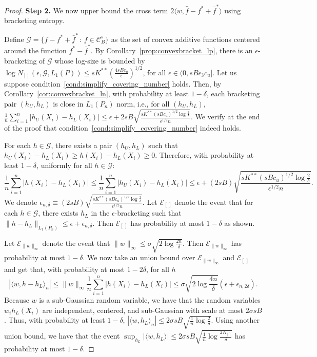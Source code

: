 \documentclass[12pt,pdftex,aos,noinfoline,addressasfootnote]{imsart}
\begin{document}
\begin{proof}


\textbf{Step 2.} We now upper bound the cross term $2 \langle w,
\hat{f} - f^* + \bar{f}^* \rangle$ using bracketing entropy.

Define $\mathcal{G} =\{ f - f^* + \bar{f}^* \,:\, f \in
\mathcal{C}^s_B \}$ 
as the set of convex additive functions centered around the function $f^* - \bar{f}^*$. 
By Corollary~\ref{prop:convexbracket_lp}, there is an $\epsilon$-bracketing of $\mathcal{G}$ whose log-size is bounded by $\log N_{[]}( \epsilon, \mathcal{G}, L_1(P)) \leq sK^{**} \left( \frac{4sBc_u}{\epsilon} \right)^{1/2}$, for all $\epsilon \in (0, sB \epsilon_3c_u]$.
Let us suppose condition~\ref{cond:simplify_covering_number} holds. Then, by Corollary~\ref{cor:convexbracket_ln}, with probability at least $1-\delta$, each bracketing pair $(h_U, h_L)$ is close in $L_1(P_n)$ norm, i.e., for all $(h_U, h_L)$, 
$\frac{1}{n} \sum_{i=1}^n | h_U(X_i) - h_L(X_i) | \leq \epsilon + 2sB \sqrt{ \frac{sK^{**}(sBc_u)^{1/2} \log \frac{2}{\delta}}{\epsilon^{1/2} n}}$. We verify at the
end of the proof that 
condition~\ref{cond:simplify_covering_number} indeed holds.

For each $h \in \mathcal{G}$, there exists a pair $(h_U, h_L)$ such that $h_U(X_i) - h_L(X_i) \geq h(X_i) - h_L(X_i) \geq 0$. Therefore, with probability at least $1-\delta$, uniformly for all $h \in \mathcal{G}$:
$$
\frac{1}{n} \sum_{i=1}^n |h(X_i) - h_L(X_i)| \leq \frac{1}{n} \sum_{i=1}^n | h_U(X_i) - h_L(X_i)| \leq \epsilon +  (2sB) \sqrt{ \frac{sK^{**}(sBc_u)^{1/2} \log \frac{2}{\delta}}{\epsilon^{1/2} n}}.
$$
We denote $\epsilon_{n,\delta} \equiv (2sB) \sqrt{
  \frac{sK^{**}(sBc_u)^{1/2} \log \frac{2}{\delta}}{\epsilon^{1/2}
    n}}$. Let $\mathcal{E}_{[\,]}$ denote the event that for each $h
\in \mathcal{G}$, there exists $h_L$ in the $\epsilon$-bracketing such
that $\|h-h_L\|_{L_1(P_n)} \leq \epsilon + \epsilon_{n, \delta}$. Then
$\mathcal{E}_{[\,]}$ has probability at most $1-\delta$ as shown.

Let $\mathcal{E}_{\|w\|_\infty}$ denote the event that $\| w \|_\infty
\leq \sigma \sqrt{ 2\log \frac{2n}{\delta}}$.  Then
$\mathcal{E}_{\|w\|_\infty}$ has probability at most $1-\delta$. We
now take an union bound over $\mathcal{E}_{\|w\|_\infty}$ and
$\mathcal{E}_{[\,]}$ and get that, with probability at most
$1-2\delta$, for all $h$
\[
|\langle w, h - h_L\rangle_n| \leq \| w \|_\infty \frac{1}{n} \sum_{i=1}^n |h(X_i) - h_L(X_i)| \leq
  \sigma \sqrt{2 \log \frac{4n}{\delta}} \left( \epsilon + \epsilon_{n,2\delta} \right).
\]
Because $w$ is a sub-Gaussian random variable, we have that the random variables $w_i h_L(X_i)$ are independent, centered, and sub-Gaussian with scale at most $2\sigma sB$. 
Thus, with probability at least $1-\delta$,
$|\langle w, h_L \rangle_n | \leq 2\sigma sB \sqrt{
  \frac{1}{n} \log \frac{2}{\delta} }$. Using another union bound, we
have that the event $\sup_{h_L} |\langle w, h_L \rangle| \leq 2\sigma sB
\sqrt{ \frac{1}{n}\log \frac{2 N_{[]}}{\delta}}$ has
probability at most $1-\delta$.


\end{proof}
\end{document}
